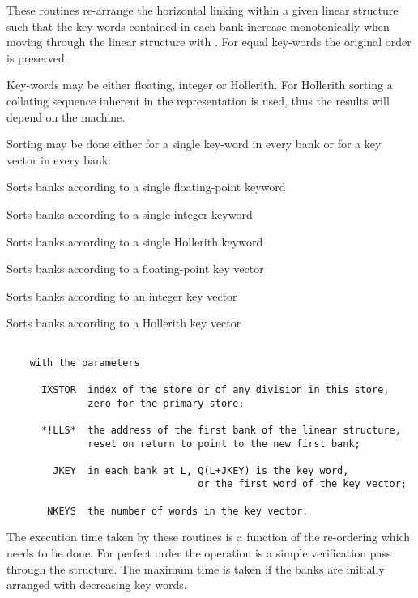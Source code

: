 These routines re-arrange the horizontal linking
within a given linear structure such that the key-words contained in
each bank increase monotonically when moving through the linear
structure with .
For equal key-words the original order is preserved.

Key-words may be either floating, integer or Hollerith.
For Hollerith sorting a collating sequence
inherent in the representation is used,
thus the results will depend on the machine.

Sorting may be done either for a single key-word in every bank
or for a key vector in every bank:


Sorts banks according to a single floating-point keyword


Sorts banks according to a single integer keyword


Sorts banks according to a single Hollerith keyword

\medskip


Sorts banks according to a floating-point key vector


Sorts banks according to an integer key vector


Sorts banks according to a Hollerith key vector

\begin{verbatim}

    with the parameters

      IXSTOR  index of the store or of any division in this store,
              zero for the primary store;

      *!LLS*  the address of the first bank of the linear structure,
              reset on return to point to the new first bank;

        JKEY  in each bank at L, Q(L+JKEY) is the key word,
                                 or the first word of the key vector;

       NKEYS  the number of words in the key vector.
\end{verbatim}

The execution time taken by these routines is a function
of the re-ordering which needs to be done.
For perfect order the operation is a simple verification pass
through the structure.
The maximum time is taken if the banks are initially arranged with
decreasing key words.

